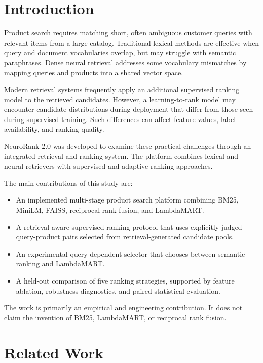 \documentclass[conference]{IEEEtran}
\begin{document}
\section{Introduction}

Product search requires matching short,
often ambiguous customer queries with
relevant items from a large catalog.
Traditional lexical methods are effective
when query and document vocabularies
overlap, but may struggle with semantic
paraphrases. Dense neural retrieval
addresses some vocabulary mismatches
by mapping queries and products into
a shared vector space.

Modern retrieval systems frequently
apply an additional supervised ranking
model to the retrieved candidates.
However, a learning-to-rank model may
encounter candidate distributions during
deployment that differ from those seen
during supervised training. Such
differences can affect feature values,
label availability, and ranking quality.

NeuroRank 2.0 was developed to examine
these practical challenges through an
integrated retrieval and ranking system.
The platform combines lexical and neural
retrievers with supervised and adaptive
ranking approaches.

The main contributions of this study are:

\begin{itemize}
\item An implemented multi-stage product
search platform combining BM25, MiniLM,
FAISS, reciprocal rank fusion, and
LambdaMART.

\item A retrieval-aware supervised ranking
protocol that uses explicitly judged
query-product pairs selected from
retrieval-generated candidate pools.

\item An experimental query-dependent
selector that chooses between semantic
ranking and LambdaMART.

\item A held-out comparison of five
ranking strategies, supported by
feature ablation, robustness diagnostics,
and paired statistical evaluation.
\end{itemize}

The work is primarily an empirical and
engineering contribution. It does not
claim the invention of BM25, LambdaMART,
or reciprocal rank fusion.

\section{Related Work}
\end{document}
